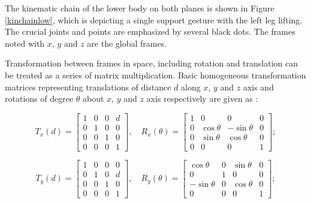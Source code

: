 The kinematic chain of the lower body on both planes is shown in Figure {\ref{kinchainlow}}, which is depicting a single support gesture with the left leg lifting. The crucial joints and points are emphasized by several black dots. The frames noted with $ x $, $ y $ and $ z $ are the global frames.

Transformation between frames in space, including rotation and translation can be treated as a series of matrix multiplication.
Basic homogeneous transformation matrices representing translations of distance $ d $ along $ x $, $ y $ and $ z $ axis and rotations of degree $ \theta $ about $ x $, $ y $ and $ z $ axis respectively are given as \cite{spong2008robot}:

\begin{equation}
T_{x}(d)=
\begin{bmatrix}
1&0&0&d\\0&1&0&0\\0&0&1&0\\0&0&0&1
\end{bmatrix},
\quad
R_{x}(\theta)=
\begin{bmatrix}
1&0&0&0\\0 &\cos\theta&-\sin\theta&0\\0 &\sin\theta&\cos\theta&0\\0&0&0&1
\end{bmatrix};
\end{equation}

\begin{equation}
T_{y}(d)=
\begin{bmatrix}
1&0&0&0\\0&1&0&d\\0&0&1&0\\0&0&0&1
\end{bmatrix},
\quad
R_{y}(\theta)=
\begin{bmatrix}
\cos\theta&0&\sin\theta&0\\0&1&0&0\\-\sin\theta&0&\cos\theta&0\\0&0&0&1
\end{bmatrix};
\end{equation}

